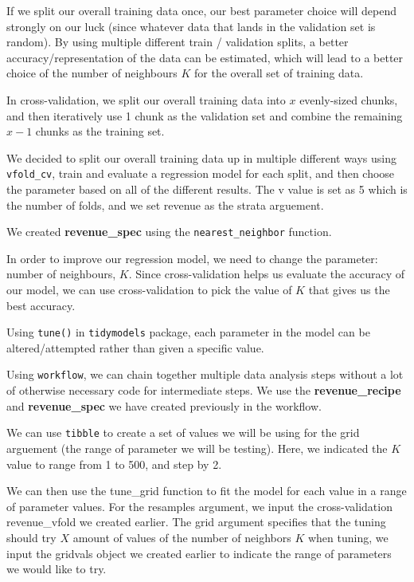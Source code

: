 \documentclass[
]{article}
\begin{document}
If we split our overall training data once, our best parameter choice will depend strongly on our luck (since whatever data that lands in the validation set is random). By using multiple different train / validation splits, a better accuracy/representation of the data can be estimated, which will lead to a better choice of the number of neighbours \(K\) for the overall set of training data.

In cross-validation, we split our overall training data into \(x\) evenly-sized chunks, and then iteratively use 1 chunk as the validation set and combine the remaining \(x-1\) chunks as the training set.

We decided to split our overall training data up in multiple different ways using \texttt{vfold\_cv}, train and evaluate a regression model for each split, and then choose the parameter based on all of the different results. The v value is set as 5 which is the number of folds, and we set revenue as the strata arguement.

We created \textbf{revenue\_spec} using the \texttt{nearest\_neighbor} function.

In order to improve our regression model, we need to change the parameter: number of neighbours, \(K\). Since cross-validation helps us evaluate the accuracy of our model, we can use cross-validation to pick the value of
\(K\) that gives us the best accuracy.

Using \texttt{tune()} in \texttt{tidymodels} package, each parameter in the model can be altered/attempted rather than given a specific value.

Using \texttt{workflow}, we can chain together multiple data analysis steps without a lot of otherwise necessary code for intermediate steps. We use the \textbf{revenue\_recipe} and \textbf{revenue\_spec} we have created previously in the workflow.

We can use \texttt{tibble} to create a set of values we will be using for the grid arguement (the range of parameter we will be testing). Here, we indicated the \(K\) value to range from 1 to 500, and step by 2.

We can then use the tune\_grid function to fit the model for each value in a range of parameter values. For the resamples argument, we input the cross-validation revenue\_vfold we created earlier. The grid argument specifies that the tuning should try \(X\) amount of values of the number of neighbors \(K\) when tuning, we input the gridvals object we created earlier to indicate the range of parameters we would like to try.
\end{document}

